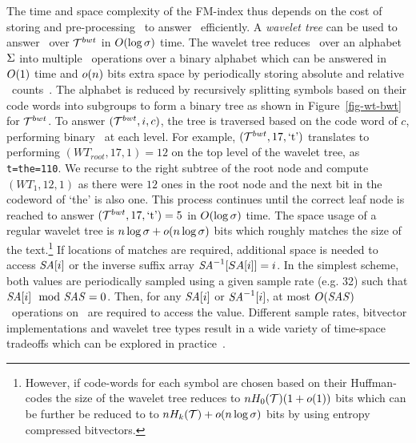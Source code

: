 The time and space complexity of the FM-index thus depends on the cost of storing
and pre-processing \colbwt\ to answer \rankop\ efficiently. A {\it wavelet tree}
can be used to answer \rankop\ over $\mathcal{T}^{bwt}$ in $O(\log \sigma)$ time.
The wavelet tree reduces \rankop\ over an alphabet $\Sigma$ into multiple
\rankop\ operations over a binary alphabet which can be answered 
in $O(1)$ time and $o(n)$ bits extra space by periodically storing absolute
and relative \rankop\ counts~\cite{m-fsttcs96}. The alphabet is
reduced by recursively splitting symbols based on their code words into subgroups to 
form a binary tree as shown in Figure~\ref{fig-wt-bwt} for $\mathcal{T}^{bwt}$. To answer
\rankop$(\mathcal{T}^{bwt},i,c)$, the tree is traversed based on the code word of $c$, performing
binary \rankop\ at each level. For example, \rankop$(\mathcal{T}^{bwt},17,\text{`t'})$ translates
to performing \rankop$(WT_{root},17,1)=12$ on the top level of the wavelet 
tree, as {\tt t=the=110}. We recurse to the right subtree of the root node and
compute \rankop$(WT_{1},12,1)$ as there were $12$ ones in the root node and
the next bit in the codeword of `the' is also one. This process continues until 
the correct leaf node is reached to answer \rankop$(\mathcal{T}^{bwt},17,\text{`t'})=5$ in 
$O(\log \sigma)$ time. The space usage of a regular wavelet tree is
$n \log \sigma + o(n \log \sigma)$ bits which roughly
matches the size of the text.\footnote{However, if code-words for each symbol are chosen
based on their Huffman-codes the size of the wavelet tree reduces to $nH_0(\mathcal{T})(1 + o(1))$
bits which can be further be reduced to to $n H_k(\mathcal{T})+o(n \log \sigma)$ bits by using 
entropy compressed bitvectors.} If locations of matches are required, additional space is needed 
to access $\mbox{\emph{SA}}[i]$ or the inverse suffix array $\mbox{\emph{SA}}^{-1}[SA[i]]=i$. In the simplest scheme, both 
values are periodically sampled using a given sample rate \SASAMPLE (e.g. 32) such that $\mbox{\emph{SA}}[i] \mod {\mbox{\emph{SAS}}} = 0$. Then, 
for any $\mbox{\emph{SA}}[i]$ or $\mbox{\emph{SA}}^{-1}[i]$, at most $O(\mbox{\emph{SAS}})$ \rankop\
operations on \colbwt\ are required to access the value.
Different sample rates, bitvector implementations and wavelet tree types result
in a wide variety of time-space tradeoffs which can be explored 
in practice~\cite{gbmp2014sea}.

